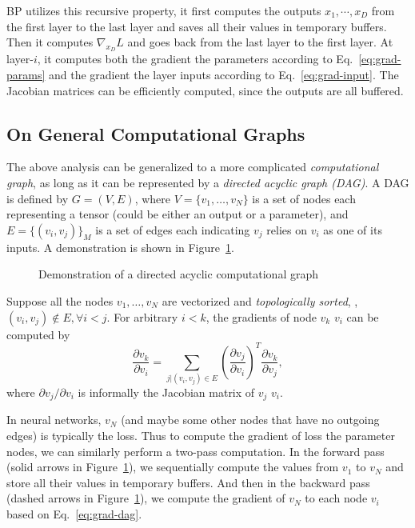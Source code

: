 BP utilizes this recursive property, it first computes the outputs $x_1, \cdots, x_D$ from the first layer to the last layer and saves all their values in temporary buffers. Then it computes $\nabla_{x_D}L$ and goes back from the last layer to the first layer. At layer-$i$, it computes both the gradient \wrt the parameters according to Eq.~\eqref{eq:grad-params} and the gradient \wrt the layer inputs according to Eq.~\eqref{eq:grad-input}. The Jacobian matrices can be efficiently computed, since the outputs are all buffered.

\subsection{On General Computational Graphs} %
\label{sub:dl-bp-on-graphs}
The above analysis can be generalized to a more complicated \emph{computational graph}, as long as it can be represented by a \emph{directed acyclic graph (DAG)}. A DAG is defined by $G=(V,E)$, where $V=\{v_1,\dots,v_N\}$ is a set of nodes each representing a tensor (could be either an output or a parameter), and $E=\{(v_i, v_j)\}_M$ is a set of edges each indicating $v_j$ relies on $v_i$ as one of its inputs. A demonstration is shown in Figure~\ref{fig:dl-dag}.
\begin{figure}[t]
\begin{center}
\fbox{\rule{0pt}{2in} \rule{0.9\linewidth}{0pt}}
\caption{Demonstration of a directed acyclic computational graph}
\label{fig:dl-dag}
\end{center}
\end{figure}

Suppose all the nodes $v_1,\dots,v_N$ are vectorized and \emph{topologically sorted}, \ie, $(v_i, v_j)\notin E, \forall i < j$. For arbitrary $i < k$, the gradients of node $v_k$ \wrt $v_i$ can be computed by
\begin{equation} \label{eq:grad-dag}
  \frac{\partial v_k}{\partial v_i} = \sum_{j | (v_i, v_j) \in E} \left(\frac{\partial v_j}{\partial v_i}\right)^T \frac{\partial v_k}{\partial v_j},
\end{equation}
where $\partial v_j/\partial v_i$ is informally the Jacobian matrix of $v_j$ \wrt $v_i$.

In neural networks, $v_N$ (and maybe some other nodes that have no outgoing edges) is typically the loss. Thus to compute the gradient of loss \wrt the parameter nodes, we can similarly perform a two-pass computation. In the forward pass (solid arrows in Figure~\ref{fig:dl-dag}), we sequentially compute the values from $v_1$ to $v_N$ and store all their values in temporary buffers. And then in the backward pass (dashed arrows in Figure~\ref{fig:dl-dag}), we compute the gradient of $v_N$ \wrt to each node $v_i$ based on Eq.~\eqref{eq:grad-dag}.





